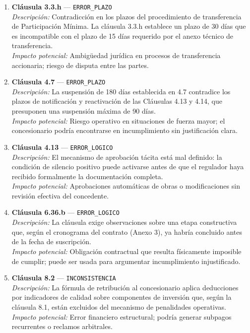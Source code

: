 \begin{enumerate}
    \item \textbf{Cláusula 3.3.h} — \texttt{ERROR\_PLAZO} \\
    \textit{Descripción:} Contradicción en los plazos del procedimiento de
    transferencia de Participación Mínima. La cláusula 3.3.h establece un
    plazo de 30 días que es incompatible con el plazo de 15 días requerido
    por el anexo técnico de transferencia. \\
    \textit{Impacto potencial:} Ambigüedad jurídica en procesos de transferencia
    accionaria; riesgo de disputa entre las partes.

    \item \textbf{Cláusula 4.7} — \texttt{ERROR\_PLAZO} \\
    \textit{Descripción:} La suspensión de 180 días establecida en 4.7 contradice
    los plazos de notificación y reactivación de las Cláusulas 4.13 y 4.14,
    que presuponen una suspensión máxima de 90 días. \\
    \textit{Impacto potencial:} Riesgo operativo en situaciones de fuerza mayor;
    el concesionario podría encontrarse en incumplimiento sin justificación
    clara.

    \item \textbf{Cláusula 4.13} — \texttt{ERROR\_LOGICO} \\
    \textit{Descripción:} El mecanismo de aprobación tácita está mal definido:
    la condición de silencio positivo puede activarse antes de que el regulador
    haya recibido formalmente la documentación completa. \\
    \textit{Impacto potencial:} Aprobaciones automáticas de obras o modificaciones
    sin revisión efectiva del concedente.

    \item \textbf{Cláusula 6.36.b} — \texttt{ERROR\_LOGICO} \\
    \textit{Descripción:} La cláusula exige observaciones sobre una etapa
    constructiva que, según el cronograma del contrato (Anexo 3), ya habría
    concluido antes de la fecha de suscripción. \\
    \textit{Impacto potencial:} Obligación contractual que resulta físicamente
    imposible de cumplir; puede ser usada para argumentar incumplimiento
    injustificado.

    \item \textbf{Cláusula 8.2} — \texttt{INCONSISTENCIA} \\
    \textit{Descripción:} La fórmula de retribución al concesionario aplica
    deducciones por indicadores de calidad sobre componentes de inversión
    que, según la cláusula 8.1, están excluidos del mecanismo de penalidades
    operativas. \\
    \textit{Impacto potencial:} Error financiero estructural; podría generar
    subpagos recurrentes o reclamos arbitrales.
\end{enumerate}


